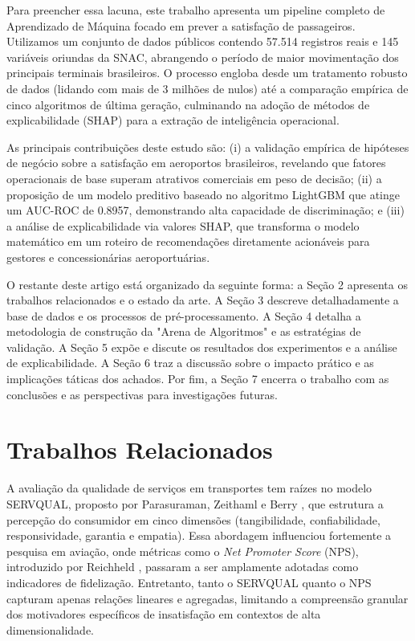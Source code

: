 \documentclass[12pt]{article}
\begin{document}
Para preencher essa lacuna, este trabalho apresenta um pipeline completo de Aprendizado de Máquina focado em prever a satisfação de passageiros. Utilizamos um conjunto de dados públicos contendo 57.514 registros reais e 145 variáveis oriundas da SNAC, abrangendo o período de maior movimentação dos principais terminais brasileiros. O processo engloba desde um tratamento robusto de dados (lidando com mais de 3 milhões de nulos) até a comparação empírica de cinco algoritmos de última geração, culminando na adoção de métodos de explicabilidade (SHAP) para a extração de inteligência operacional.

As principais contribuições deste estudo são: (i) a validação empírica de hipóteses de negócio sobre a satisfação em aeroportos brasileiros, revelando que fatores operacionais de base superam atrativos comerciais em peso de decisão; (ii) a proposição de um modelo preditivo baseado no algoritmo LightGBM que atinge um AUC-ROC de 0.8957, demonstrando alta capacidade de discriminação; e (iii) a análise de explicabilidade via valores SHAP, que transforma o modelo matemático em um roteiro de recomendações diretamente acionáveis para gestores e concessionárias aeroportuárias.

O restante deste artigo está organizado da seguinte forma: a Seção 2 apresenta os trabalhos relacionados e o estado da arte. A Seção 3 descreve detalhadamente a base de dados e os processos de pré-processamento. A Seção 4 detalha a metodologia de construção da "Arena de Algoritmos" e as estratégias de validação. A Seção 5 expõe e discute os resultados dos experimentos e a análise de explicabilidade. A Seção 6 traz a discussão sobre o impacto prático e as implicações táticas dos achados. Por fim, a Seção 7 encerra o trabalho com as conclusões e as perspectivas para investigações futuras.

\section{Trabalhos Relacionados}

A avaliação da qualidade de serviços em transportes tem raízes no modelo SERVQUAL, proposto por Parasuraman, Zeithaml e Berry \cite{parasuraman1988servqual}, que estrutura a percepção do consumidor em cinco dimensões (tangibilidade, confiabilidade, responsividade, garantia e empatia). Essa abordagem influenciou fortemente a pesquisa em aviação, onde métricas como o \textit{Net Promoter Score} (NPS), introduzido por Reichheld \cite{reichheld2003nps}, passaram a ser amplamente adotadas como indicadores de fidelização. Entretanto, tanto o SERVQUAL quanto o NPS capturam apenas relações lineares e agregadas, limitando a compreensão granular dos motivadores específicos de insatisfação em contextos de alta dimensionalidade.
\end{document}
